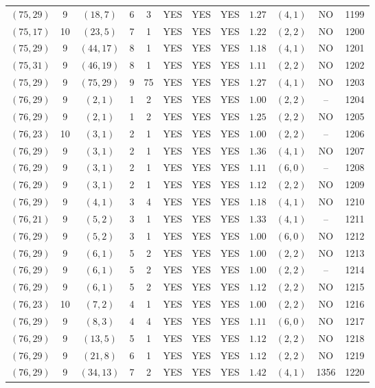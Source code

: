 \begin{longtable}{|c|c|c|c|c|c|c|c|c|c|c|c|}
$(75,29)$ & 9 & $(18,7)$ & 6 & 3 & YES & YES & YES & $1.27$ & $(4,1)$ & NO & 1199\\
$(75,17)$ & 10 & $(23,5)$ & 7 & 1 & YES & YES & YES & $1.22$ & $(2,2)$ & NO & 1200\\
$(75,29)$ & 9 & $(44,17)$ & 8 & 1 & YES & YES & YES & $1.18$ & $(4,1)$ & NO & 1201\\
$(75,31)$ & 9 & $(46,19)$ & 8 & 1 & YES & YES & YES & $1.11$ & $(2,2)$ & NO & 1202\\
$(75,29)$ & 9 & $(75,29)$ & 9 & 75 & YES & YES & YES & $1.27$ & $(4,1)$ & NO & 1203\\
$(76,29)$ & 9 & $(2,1)$ & 1 & 2 & YES & YES & YES & $1.00$ & $(2,2)$ & -- & 1204\\
$(76,29)$ & 9 & $(2,1)$ & 1 & 2 & YES & YES & YES & $1.25$ & $(2,2)$ & NO & 1205\\
$(76,23)$ & 10 & $(3,1)$ & 2 & 1 & YES & YES & YES & $1.00$ & $(2,2)$ & -- & 1206\\
$(76,29)$ & 9 & $(3,1)$ & 2 & 1 & YES & YES & YES & $1.36$ & $(4,1)$ & NO & 1207\\
$(76,29)$ & 9 & $(3,1)$ & 2 & 1 & YES & YES & YES & $1.11$ & $(6,0)$ & -- & 1208\\
$(76,29)$ & 9 & $(3,1)$ & 2 & 1 & YES & YES & YES & $1.12$ & $(2,2)$ & NO & 1209\\
$(76,29)$ & 9 & $(4,1)$ & 3 & 4 & YES & YES & YES & $1.18$ & $(4,1)$ & NO & 1210\\
$(76,21)$ & 9 & $(5,2)$ & 3 & 1 & YES & YES & YES & $1.33$ & $(4,1)$ & -- & 1211\\
$(76,29)$ & 9 & $(5,2)$ & 3 & 1 & YES & YES & YES & $1.00$ & $(6,0)$ & NO & 1212\\
$(76,29)$ & 9 & $(6,1)$ & 5 & 2 & YES & YES & YES & $1.00$ & $(2,2)$ & NO & 1213\\
$(76,29)$ & 9 & $(6,1)$ & 5 & 2 & YES & YES & YES & $1.00$ & $(2,2)$ & -- & 1214\\
$(76,29)$ & 9 & $(6,1)$ & 5 & 2 & YES & YES & YES & $1.12$ & $(2,2)$ & NO & 1215\\
$(76,23)$ & 10 & $(7,2)$ & 4 & 1 & YES & YES & YES & $1.00$ & $(2,2)$ & NO & 1216\\
$(76,29)$ & 9 & $(8,3)$ & 4 & 4 & YES & YES & YES & $1.11$ & $(6,0)$ & NO & 1217\\
$(76,29)$ & 9 & $(13,5)$ & 5 & 1 & YES & YES & YES & $1.12$ & $(2,2)$ & NO & 1218\\
$(76,29)$ & 9 & $(21,8)$ & 6 & 1 & YES & YES & YES & $1.12$ & $(2,2)$ & NO & 1219\\
$(76,29)$ & 9 & $(34,13)$ & 7 & 2 & YES & YES & YES & $1.42$ & $(4,1)$ & 1356 & 1220\\

\end{longtable}
